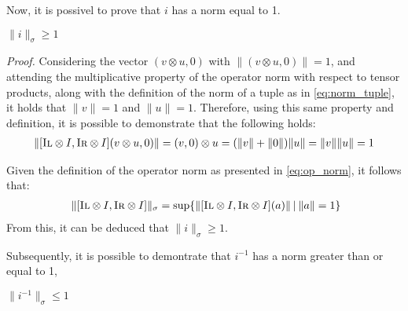 Now, it is possivel to prove that $i$ has a norm equal to 1.

\begin{lemma} \label{lem3}
  $  \lVert i\rVert_{\sigma} \geq 1 $
\end{lemma}

\vspace{10pt}

\textit{Proof.} \quad Considering the vector $(v \otimes u, 0)$ with $\lVert(v \otimes u, 0)\rVert = 1$, and  attending the multiplicative property of the operator norm with respect to tensor products, along with the definition of the norm of a tuple as in \autoref{eq:norm_tuple}, it holds that $\lVert v \rVert = 1$ and $\lVert u \rVert =1$. Therefore, using this same property and definition, it is possible to demonstrate that the following holds:
  \begin{equation}
    \begin{split}
      \lVert [\textsc{Il} \otimes I, \textsc{Ir} \otimes I ] (v \otimes u, 0) \rVert = (v, 0)\otimes u = (\lVert v \rVert + \lVert 0 \rVert ) \lVert u \rVert = \lVert v \rVert \lVert u \rVert =1
    \end{split}
  \end{equation}
 
Given the definition of the operator norm as presented in \autoref{eq:op_norm}, it follows that:
\begin{equation}
  \begin{split}
      & \hspace{3pt} \lVert [\textsc{Il} \otimes I, \textsc{Ir} \otimes I ]  \rVert_{\sigma}  = \text{sup} \{ \lVert [\textsc{Il} \otimes I , \textsc{Ir} \otimes I ] (a) \rVert \hspace{2pt} | \hspace{2pt} \lVert a \rVert = 1 \} \\
  \end{split}
  \end{equation}
  From this, it can be deduced that $\lVert i \rVert_{\sigma} \geq 1$.

Subsequently, it is possible to demontrate that $i^{-1}$ has a norm greater than or equal to 1,

\begin{lemma} \label{lem4}
  $  \lVert i^{-1}  \rVert_{\sigma} \leq 1 $
\end{lemma}

